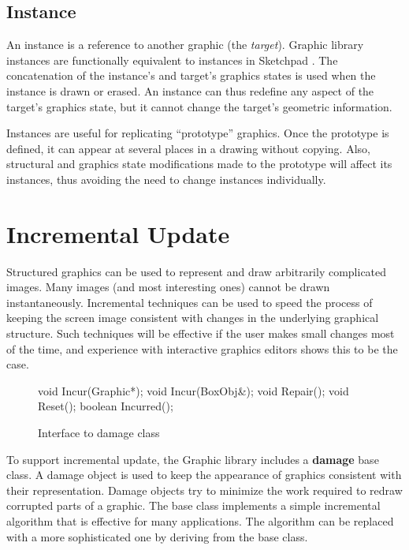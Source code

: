 \subsection{Instance}

An instance is a reference to another graphic (the {\em target}).
Graphic library instances are functionally equivalent to
instances in Sketchpad \cite{sketchpad}. The concatenation of the instance's
and target's graphics states is used when the instance is drawn or erased.
An instance can thus redefine any aspect of the target's graphics state, but
it cannot change the target's geometric information.  

Instances are useful for replicating ``prototype'' graphics.  Once the
prototype is defined, it can appear at several places in a drawing without
copying.  Also, structural and graphics state modifications made to the
prototype will affect its instances, thus avoiding the need to change
instances individually.

\section{Incremental Update}

Structured graphics can be used to represent and draw arbitrarily
complicated images.  Many
images (and most interesting ones) cannot be drawn instantaneously.
Incremental techniques can be used
to speed the process of keeping the screen image consistent with
changes in the underlying graphical structure.  
Such techniques will be effective if the user makes
small changes most of the time, and experience with interactive
graphics editors shows this to be the case.

\begin{figure*}
\begin{code}{2em}
void Incur(Graphic*);
void Incur(BoxObj&);
void Repair();
void Reset();
boolean Incurred();
\end{code}
\vspace{1ex}
\caption{Interface to damage class}
\label{damageops}
\end{figure*}

To support incremental update, the Graphic library includes a {\bf
damage} base class.  A damage object is used to keep
the appearance of graphics consistent with their representation.
Damage objects try to minimize the work required to
redraw corrupted parts of a graphic.  The base class implements a simple
incremental algorithm that is effective for many applications.
The algorithm can be replaced with a more sophisticated one by
deriving from the base class.

